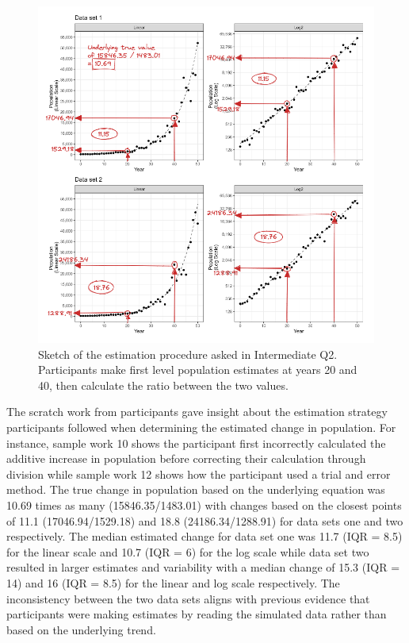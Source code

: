 \documentclass[print]{nuthesis}
\begin{document}
\begin{figure}[tbp]

{\centering \includegraphics[width=1\linewidth,]{images/03-estimation/qi2-sketch} 

}

\caption[Intermediate Q2 sketch]{Sketch of the estimation procedure asked in Intermediate Q2. Participants make first level population estimates at years 20 and 40, then calculate the ratio between the two values.}\label{fig:qi2-sketch}
\end{figure}

The scratch work from participants gave insight about the estimation strategy participants followed when determining the estimated change in population.
For instance, sample work 10 shows the participant first incorrectly calculated the additive increase in population before correcting their calculation through division while sample work 12 shows how the participant used a trial and error method.
The true change in population based on the underlying equation was 10.69 times as many (15846.35/1483.01) with changes based on the closest points of 11.1 (17046.94/1529.18) and 18.8 (24186.34/1288.91) for data sets one and two respectively.
The median estimated change for data set one was 11.7 (IQR = 8.5) for the linear scale and 10.7 (IQR = 6) for the log scale while data set two resulted in larger estimates and variability with a median change of 15.3 (IQR = 14) and 16 (IQR = 8.5) for the linear and log scale respectively.
The inconsistency between the two data sets aligns with previous evidence that participants were making estimates by reading the simulated data rather than based on the underlying trend.
\end{document}
